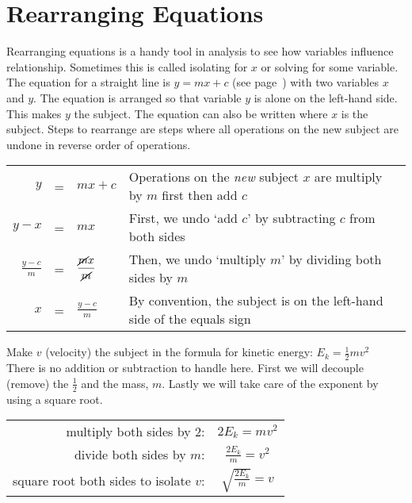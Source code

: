 \section*{Rearranging Equations}
Rearranging equations is a handy tool in analysis to see how variables influence relationship. Sometimes this is called isolating for $x$ or solving for some variable. The equation for a straight line is $y = mx + c$ (see page~\pageref{sec:linearFunction}) with two variables $x$ and $y$. The equation is arranged so that variable $y$ is alone on the left-hand side. This makes $y$ the subject. The equation can also be written where $x$ is the subject. Steps to rearrange are steps where all operations on the new subject are undone in reverse order of operations.\\
\begin{center}
\begin{tabular}{rcll}
	\toprule
	$y$&=&$ mx + c$&Operations on the \textit{new} subject $x$ are multiply by $m$ first then add $c$\\\medskip
	$y-x$&=&$mx$&First, we undo `add $c$' by subtracting $c$ from both sides\\
	$\displaystyle\frac{y-c}{m}$&=&$\displaystyle\frac{\cancel{m}x}{\cancel{m}}$&Then, we undo `multiply $m$' by dividing both sides by $m$\vspace{1em}\\
	$x$&=&$\displaystyle\frac{y-c}{m}$&By convention, the subject is on the left-hand side of the equals sign\\
	\bottomrule
\end{tabular}
\end{center}
\example Make $v$ (velocity) the subject in the formula for kinetic energy: $E_k=\frac{1}{2}mv^2$\medskip\\
\solution There is no addition or subtraction to handle here. First we will decouple (remove) the $\frac{1}{2}$ and the mass, $m$. Lastly we will take care of the exponent by using a square root.
\begin{center}
	\begin{tabular}{rc}
		multiply both sides by 2:&$2E_k=mv^2$\vspace{1em}\\
		divide both sides by $m$:&$\displaystyle\frac{2E_k}{m}=v^2$\vspace{1em}\\
		square root both sides to isolate $v$:&$\displaystyle\sqrt{\frac{2E_k}{m}}=v$\\
	\end{tabular}
\end{center}



